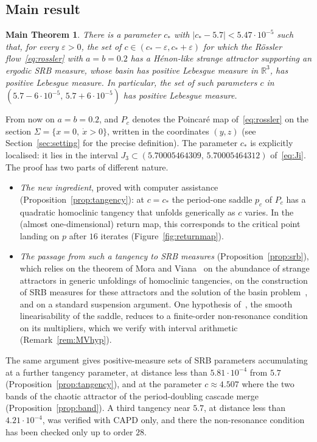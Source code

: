 \documentclass[11pt]{amsart}
\newtheorem*{mainthm}{Main Theorem}
\theoremstyle{definition}
\theoremstyle{remark}
\newcommand{\R}{\mathbb{R}}
\newcommand{\cs}{c_*}
\begin{document}
\subsection*{Main result}

\begin{mainthm}
There is a parameter $\cs$ with $|\cs-5.7|<5.47\cdot10^{-5}$ such that, for every $\varepsilon>0$, the set of
$c\in(\cs-\varepsilon,\cs+\varepsilon)$ for which the R\"ossler flow~\eqref{eq:rossler} with $a=b=0.2$ has a
H\'enon-like strange attractor supporting an ergodic SRB measure, whose basin has positive Lebesgue measure
in $\R^3$, has positive Lebesgue measure. In particular, the set of such parameters $c$ in
$(5.7-6\cdot10^{-5},\,5.7+6\cdot10^{-5})$ has positive Lebesgue measure.
\end{mainthm}

From now on $a=b=0.2$, and $P_c$ denotes the Poincar\'e map of~\eqref{eq:rossler} on the section
$\Sigma=\{x=0,\ \dot x>0\}$, written in the coordinates $(y,z)$ (see Section~\ref{sec:setting} for the
precise definition). The parameter $\cs$ is explicitly localised: it lies in the interval $J_3\subset(5.70005464309,\,5.70005464312)$
of~\eqref{eq:Ji}. The proof has two parts of different nature.
\begin{itemize}[leftmargin=*]
\item \emph{The new ingredient}, proved with computer assistance (Proposition~\ref{prop:tangency}): at
$c=\cs$ the period-one saddle $p_c$ of $P_c$ has a quadratic homoclinic tangency that unfolds generically
as $c$ varies. In the (almost one-dimensional) return map, this corresponds to the critical point landing
on $p$ after $16$ iterates (Figure~\ref{fig:returnmap}).
\item \emph{The passage from such a tangency to SRB measures} (Proposition~\ref{prop:srb}), which relies on
the theorem of Mora and Viana~\cite{MV93} on the abundance of strange attractors in generic unfoldings of
homoclinic tangencies, on the construction of SRB measures for these attractors and the solution of the
basin problem~\cite{BY93,BV01,Viana98}, and on a standard suspension argument. One hypothesis
of~\cite{MV93}, the smooth linearisability of the saddle, reduces to a finite-order non-resonance condition on its
multipliers, which we verify with interval arithmetic (Remark~\ref{rem:MVhyp}).
\end{itemize}
The same argument gives positive-measure sets of SRB parameters accumulating at a further tangency
parameter, at distance less than $5.81\cdot10^{-4}$ from $5.7$ (Proposition~\ref{prop:tangency}), and at the
parameter $c\approx4.507$ where the two bands of the chaotic attractor of the period-doubling cascade merge
(Proposition~\ref{prop:band}). A third tangency near $5.7$, at distance less than $4.21\cdot10^{-4}$, was verified
with CAPD only, and there the non-resonance condition has been checked only up to order $28$.
\end{document}
